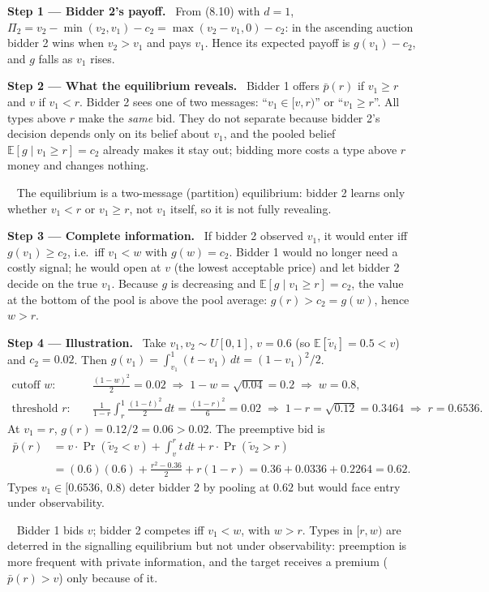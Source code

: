 \documentclass[11pt,a4paper]{article}
\newcommand{\step}[2]{\par\medskip\noindent\textbf{Step #1 --- #2.}~}
\newcommand{\answer}[1]{\par\smallskip\noindent\fbox{\textbf{Answer #1.}}~}
\newcommand{\E}{\mathbb{E}}
\begin{document}
\step{1}{Bidder 2's payoff} From (8.10) with $d=1$, $\Pi_2=v_2-\min(v_2,v_1)-c_2=\max(v_2-v_1,0)-c_2$:
in the ascending auction bidder 2 wins when $v_2>v_1$ and pays $v_1$. Hence its expected payoff is
$g(v_1)-c_2$, and $g$ falls as $v_1$ rises.

\step{2}{What the equilibrium reveals} Bidder 1 offers $\bar p(r)$ if $v_1\ge r$ and $v$ if $v_1<r$.
Bidder 2 sees one of two messages: ``$v_1\in[v,r)$'' or ``$v_1\ge r$''. All types above $r$ make the
\emph{same} bid. They do not separate because bidder 2's decision depends only on its belief about
$v_1$, and the pooled belief $\E[g\mid v_1\ge r]=c_2$ already makes it stay out; bidding more costs a type
above $r$ money and changes nothing.
\answer{(why)} The equilibrium is a two-message (partition) equilibrium: bidder 2 learns only whether
$v_1<r$ or $v_1\ge r$, not $v_1$ itself, so it is not fully revealing.

\step{3}{Complete information} If bidder 2 observed $v_1$, it would enter iff $g(v_1)\ge c_2$, i.e.\
iff $v_1<w$ with $g(w)=c_2$. Bidder 1 would no longer need a costly signal; he would open at $v$ (the
lowest acceptable price) and let bidder 2 decide on the true $v_1$. Because $g$ is decreasing and
$\E[g\mid v_1\ge r]=c_2$, the value at the bottom of the pool is above the pool average:
$g(r)>c_2=g(w)$, hence $w>r$.

\step{4}{Illustration} Take $v_1,v_2\sim U[0,1]$, $v=0.6$ (so $\E[\tilde v_i]=0.5<v$) and $c_2=0.02$.
Then $g(v_1)=\int_{v_1}^1(t-v_1)\,dt=(1-v_1)^2/2$.
\begin{align}
  \text{cutoff } w:&\quad \frac{(1-w)^2}{2}=0.02 \;\Rightarrow\; 1-w=\sqrt{0.04}=0.2 \;\Rightarrow\; w=0.8, \nonumber\\
  \text{threshold } r:&\quad \frac{1}{1-r}\int_r^1\frac{(1-t)^2}{2}\,dt=\frac{(1-r)^2}{6}=0.02 \;\Rightarrow\; 1-r=\sqrt{0.12}=0.3464 \;\Rightarrow\; r=0.6536. \nonumber
\end{align}
At $v_1=r$, $g(r)=0.12/2=0.06>0.02$. The preemptive bid is
\begin{align}
  \bar p(r) &= v\cdot\Pr(\tilde v_2<v)+\int_v^r t\,dt + r\cdot\Pr(\tilde v_2>r) \nonumber\\
            &= (0.6)(0.6)+\frac{r^2-0.36}{2}+r(1-r) = 0.36+0.0336+0.2264 = 0.62. \nonumber
\end{align}
Types $v_1\in[0.6536,\,0.8)$ deter bidder 2 by pooling at $0.62$ but would face entry under observability.
\answer{(observable $v_1$)} Bidder 1 bids $v$; bidder 2 competes iff $v_1<w$, with $w>r$. Types in
$[r,w)$ are deterred in the signalling equilibrium but not under observability: preemption is more
frequent with private information, and the target receives a premium ($\bar p(r)>v$) only because of it.
\end{document}
